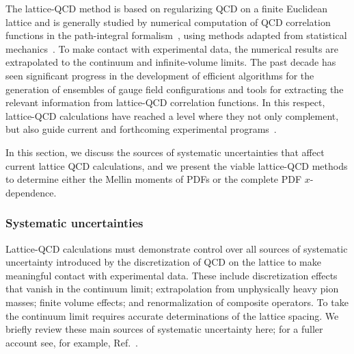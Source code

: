 The lattice-QCD method is based on regularizing QCD on a finite Euclidean 
lattice and is generally studied by numerical computation of QCD correlation 
functions in the path-integral formalism~\cite{DiPierro:2000nt,Lepage:1998dt,
Luscher:1998pe,Gupta:1997nd}, using methods adapted from statistical 
mechanics~\cite{Binder:2015klx,Newman:1999mng}.
%
To make contact with experimental data, the numerical results are extrapolated 
to the continuum and infinite-volume limits.
%
The past decade has seen significant progress in the development of efficient 
algorithms for the generation of ensembles of gauge field configurations and 
tools for extracting the relevant information from lattice-QCD
correlation functions.
%
In this respect, lattice-QCD calculations have reached a level where
they not only complement, but also guide current and forthcoming
experimental programs~\cite{Brodsky:2015aia,Aschenauer:2014twa}.

In this section, we discuss the sources of systematic uncertainties
that affect current lattice QCD calculations, and we present the 
viable lattice-QCD methods to determine either the Mellin moments of PDFs
or the complete PDF $x$-dependence.

\subsubsection{Systematic uncertainties}
Lattice-QCD calculations must demonstrate control over all sources of
systematic uncertainty introduced by the discretization of QCD on the
lattice to make meaningful contact with experimental data.
%
These
include discretization effects that vanish in the continuum limit;
extrapolation from unphysically heavy pion masses; finite volume
effects; and renormalization of composite operators.
%
To take the continuum limit requires accurate determinations of the 
lattice spacing.
% 
We briefly review these main sources of systematic uncertainty here; for a 
fuller account see, for example, Ref.~\cite{Aoki:2016frl}.

